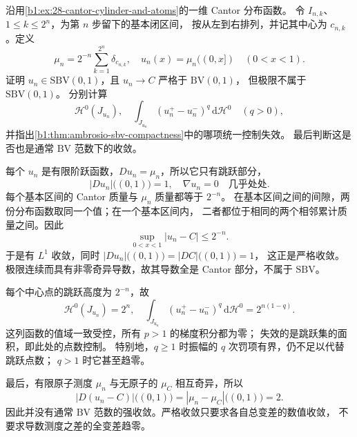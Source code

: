 \begin{exercise}\label{b1:ex:28-jump-cantor-approximation}
沿用\cref{b1:ex:28-cantor-cylinder-and-atoms}的一维 Cantor 分布函数。
令 \(I_{n,k}\)、\(1\le k\le2^n\)，为第 \(n\) 步留下的基本闭区间，
按从左到右排列，并记其中心为 \(c_{n,k}\)。定义
\[
 \mu_n=2^{-n}\sum_{k=1}^{2^n}\delta_{c_{n,k}},
 \quad
 u_n(x)=\mu_n((0,x])\quad(0<x<1).
\]
证明 \(u_n\in \mathrm{SBV}(0,1)\)，且 \(u_n\to C\) 严格于 \(\mathrm{BV}(0,1)\)，
但极限不属于 \(\mathrm{SBV}(0,1)\)。
分别计算
\[
 \mathcal H^0(J_{u_n}),\quad
 \int_{J_{u_n}}(u_n^+-u_n^-)^q\,\mathrm d\mathcal H^0
 \quad(q>0),
\]
并指出\cref{b1:thm:ambrosio-sbv-compactness}中的哪项统一控制失效。
最后判断这是否也是通常 \(\mathrm{BV}\) 范数下的收敛。
\end{exercise}
\begin{solution}
每个 \(u_n\) 是有限阶跃函数，\(Du_n=\mu_n\)，所以它只有跳跃部分，
\[
 |Du_n|\bigl((0,1)\bigr)=1,\quad \nabla u_n=0
 \quad\text{几乎处处}.
\]
每个基本区间的 Cantor 质量与 \(\mu_n\) 质量都等于 \(2^{-n}\)。
在基本区间之间的间隙，两份分布函数取同一个值；在一个基本区间内，
二者都位于相同的两个相邻累计质量之间。因此
\[
 \sup_{0<x<1}|u_n-C|\le2^{-n}.
\]
于是有 \(L^1\) 收敛，同时 \(|Du_n|\bigl((0,1)\bigr)=|DC|\bigl((0,1)\bigr)=1\)，
这正是严格收敛。极限连续而具有非零奇异导数，故其导数全是 Cantor 部分，不属于 \(\mathrm{SBV}\)。

每个中心点的跳跃高度为 \(2^{-n}\)，故
\[
 \mathcal H^0(J_{u_n})=2^n,\quad
 \int_{J_{u_n}}(u_n^+-u_n^-)^q\,\mathrm d\mathcal H^0
 =2^{n(1-q)}.
\]
这列函数的值域一致受控，所有 \(p>1\) 的梯度积分都为零；
失效的是跳跃集的面积，即此处的点数控制。
特别地，\(q\ge1\) 时振幅的 \(q\) 次罚项有界，仍不足以代替跳跃点数；
\(q>1\) 时它甚至趋零。

最后，有限原子测度 \(\mu_n\) 与无原子的 \(\mu_C\) 相互奇异，所以
\[
 |D(u_n-C)|\bigl((0,1)\bigr)=|\mu_n-\mu_C|\bigl((0,1)\bigr)=2.
\]
因此并没有通常 \(\mathrm{BV}\) 范数的强收敛。严格收敛只要求各自总变差的数值收敛，
不要求导数测度之差的全变差趋零。
\end{solution}

